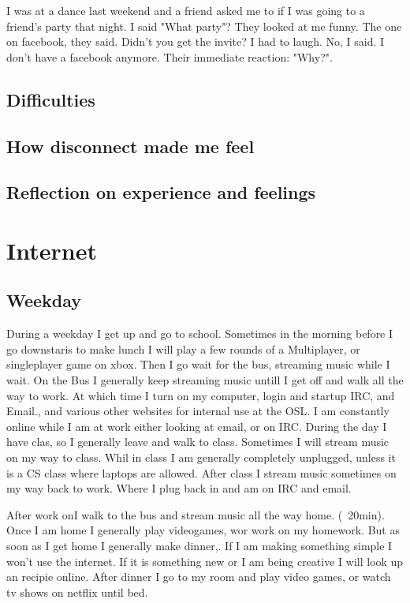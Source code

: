 \documentclass[12pt,letterpaper]{article}
\begin{document}
I was at a dance last weekend and a friend asked me to if I was
going to a friend's party that night. I said "What party"? They looked
at me funny. The one on facebook, they said. Didn't you get the invite?
I had to laugh. No, I said. I don't have a facebook anymore. Their
immediate reaction: "Why?".





\subsection{Difficulties}
\subsection{How disconnect made me feel}
\subsection{Reflection on experience and feelings}


\section{Internet}
\subsection{Weekday}
During a weekday I get up and go to school. Sometimes in the morning
before I go downstaris to make lunch I will play a few rounds of a
Multiplayer, or singleplayer game on xbox. Then I go wait for the bus,
streaming music while I wait. On the Bus I generally keep streaming
music untill I get off and walk all the way to work. At which time I
turn on my computer, login and startup IRC, and Email., and various
other websites for internal use at the OSL. I am constantly online while
I am at work either looking at email, or on IRC. During the day I have
clas, so I generally leave and walk to class. Sometimes I will stream
music on my way to class. Whil in class I am generally completely
unplugged, unless it is a CS class where laptops are allowed.  After
class I stream music sometimes on my way back to work.  Where I plug
back in and am on IRC and email.

After work onI walk to the bus and stream music all the way home.
(~20min). Once I am home I generally play videogames, wor work on my
homework. But as soon as I get home I generally make dinner,. If I am
making something simple I won't use the internet. If it is something new
or I am being creative I will look up an recipie online. After dinner I
go to my room and play video games, or watch tv shows on netflix until
bed.
\end{document}

